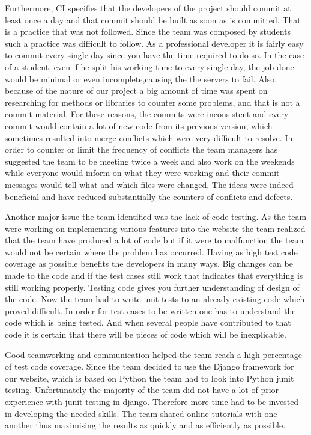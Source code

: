 \documentclass{l3proj}
\begin{document}
Furthermore, CI specifies that the developers of the project should commit at least once a day and that commit should
be built as soon as is committed. That is a practice that was not followed. Since the team was composed by students
such a practice was difficult to follow. As a professional developer it is fairly easy to commit every single day
since you have the time required to do so. In the case of a student, even if he split his working time to every single
day, the job done would be minimal or even incomplete,causing the the servers to fail. Also, because of the nature of
our project a big amount of time was spent on researching for methods or libraries to counter some problems, and that is
not a commit material. For these reasons, the commits were inconsistent and every commit would contain a lot of new
code from its previous version, which sometimes resulted into merge conflicts which were very difficult to resolve. In
order to counter or limit the frequency of conflicts the team managers has suggested the team to be meeting twice a week
and also work on the weekends while everyone would inform on what they were working and their commit messages would tell
what and which files were changed. The ideas were indeed beneficial and have reduced substantially the counters of
conflicts and defects.


Another major issue the team identified was the lack of code testing. As the team were working on implementing various features into the website the team realized that the team have produced a lot of code but if it were to malfunction the team would not be certain where the problem has occurred. Having as high test code coverage as possible benefits the developers in many ways. Big changes can be made to the code and if the test cases still work that indicates that everything is still working properly. Testing code gives you further understanding of
design of the code. Now the team had to write unit tests to an already existing code which proved difficult. In order for test cases to be written one has to understand the code which is being tested. And when several people have contributed to that code it is certain that there will be pieces of code which will be inexplicable.

Good teamworking and communication helped the team reach a high percentage of test code coverage. Since the team decided to use the Django framework for our website, which is based on Python the team had to look into Python junit testing. Unfortunately the majority of the team did not have a lot of prior experience with junit testing in django. Therefore more time had to be invested in developing the needed skills. The team shared online tutorials with one another thus maximising the results as quickly and as efficiently as possible.
\end{document}
